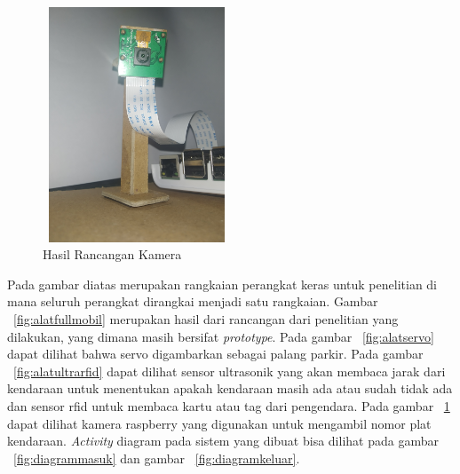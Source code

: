\begin{figure} [H]
    \includegraphics[height=7cm, width=0.5\textwidth, center]{images/alat-kamera.jpg}
    \caption{Hasil Rancangan Kamera}
    \label{fig:alatkamera}
\end{figure}

Pada gambar diatas merupakan rangkaian perangkat keras untuk penelitian di mana seluruh perangkat dirangkai menjadi satu rangkaian.  Gambar ~\ref{fig:alatfullmobil} merupakan hasil dari rancangan dari penelitian yang dilakukan, yang dimana masih bersifat \textit{prototype}. Pada gambar ~\ref{fig:alatservo} dapat dilihat bahwa servo digambarkan sebagai palang parkir. Pada gambar ~\ref{fig:alatultrarfid} dapat dilihat sensor ultrasonik yang akan membaca jarak dari kendaraan untuk menentukan apakah kendaraan masih ada atau sudah tidak ada dan sensor rfid untuk membaca kartu atau tag dari pengendara. Pada gambar ~\ref{fig:alatkamera} dapat dilihat kamera raspberry yang digunakan untuk mengambil nomor plat kendaraan. \textit{Activity} diagram pada sistem yang dibuat bisa dilihat pada gambar ~\ref{fig:diagrammasuk} dan gambar ~\ref{fig:diagramkeluar}.\newline


